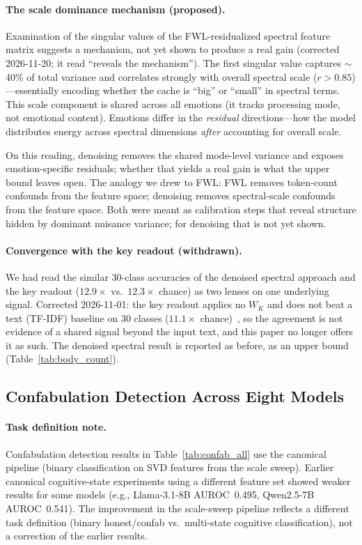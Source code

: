 \documentclass[11pt,a4paper]{article}
\begin{document}
\paragraph{The scale dominance mechanism (proposed).} Examination of the singular values
of the FWL-residualized spectral feature matrix suggests a mechanism, not yet
shown to produce a real gain (corrected 2026-11-20; it read ``reveals the
mechanism''). The
first singular value captures $\sim$40\% of total variance and correlates
strongly with overall spectral scale ($r > 0.85$)---essentially encoding
whether the cache is ``big'' or ``small'' in spectral terms. This
scale component is shared across all emotions (it tracks processing mode,
not emotional content). Emotions differ in the \emph{residual}
directions---how the model distributes energy across spectral dimensions
\emph{after} accounting for overall scale.

On this reading, denoising removes the shared mode-level variance and exposes
emotion-specific residuals; whether that yields a real gain is what the upper
bound leaves open. The analogy we drew to FWL: FWL removes
token-count confounds from the feature space; denoising removes
spectral-scale confounds from the feature space. Both were meant as
calibration steps that reveal structure hidden by dominant nuisance
variance; for denoising that is not yet shown.

\paragraph{Convergence with the key readout (withdrawn).} We had read the
similar 30-class accuracies of the denoised spectral approach and the key
readout ($12.9\times$ vs.\ $12.3\times$ chance) as two lenses on one
underlying signal. Corrected 2026-11-01: the key readout applies no $W_K$
and does not beat a text (TF-IDF) baseline on 30 classes ($11.1\times$
chance)~\citep{lyra_p4}, so the agreement is not evidence of a shared signal
beyond the input text, and this paper no longer offers it as such. The
denoised spectral result is reported as before, as an upper bound
(Table~\ref{tab:body_count}).

\subsection{Confabulation Detection Across Eight Models}
\label{sec:results_confab}

\paragraph{Task definition note.} Confabulation detection results
in Table~\ref{tab:confab_all} use the canonical pipeline (binary
classification on SVD features from the scale sweep). Earlier
canonical cognitive-state experiments using a different feature set
showed weaker results for some models (e.g., Llama-3.1-8B AUROC~0.495,
Qwen2.5-7B AUROC~0.541). The improvement in the scale-sweep pipeline
reflects a different task definition (binary honest/confab vs.\
multi-state cognitive classification), not a correction of the
earlier results.
\end{document}
